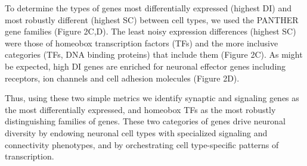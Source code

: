 To determine the types of genes most differentially expressed (highest DI) and most robustly different (highest SC) between cell types, we used the PANTHER gene families (Figure 2C,D). The least noisy expression differences (highest SC) were those of homeobox transcription factors (TFs) and the more inclusive categories (TFs, DNA binding proteins) that include them (Figure 2C). As might be expected, high DI genes are enriched for neuronal effector genes including receptors, ion channels and cell adhesion molecules (Figure 2D). 

Thus, using these two simple metrics we identify synaptic and signaling genes as the most differentially expressed, and homeobox TFs as the most robustly distinguishing families of genes. These two categories of genes drive neuronal diversity by endowing neuronal cell types with specialized signaling and connectivity phenotypes, and by orchestrating cell type-specific patterns of transcription. 


